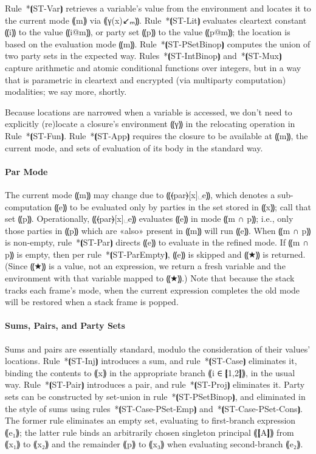 Rule~*⦗ST-Var⦘ retrieves a variable's value from the environment and
locates it to the current mode ⸨m⸩ via ⸨γ(x)↙ₘ⸩. Rule~*⦗ST-Lit⦘ evaluates
cleartext constant ⸨i⸩ to the value ⸨i@m⸩, or party set ⸨p⸩ to the value ⸨p@m⸩;
the location is based on the evaluation mode ⸨m⸩.  Rule~*⦗ST-PSetBinop⦘ computes
the union of two party sets in the expected way. Rules~*⦗ST-IntBinop⦘
and~*⦗ST-Mux⦘ capture arithmetic and atomic conditional functions over integers,
but in a way that is parametric in cleartext and encrypted (via multiparty
computation) modalities; we say more, shortly.

Because locations are narrowed when a variable is accessed, we don't need to
explicitly (re)locate a closure's environment ⸨γ⸩ in the relocating
operation in Rule~*⦗ST-Fun⦘. Rule~*⦗ST-App⦘ requires the closure to be available at ⸨m⸩,
the current mode, and sets of evaluation of its body in the standard way.

\paragraph*{Par Mode}

The current mode ⸨m⸩ may change due to ⸨⦑par⦒[x]␣e⸩, which denotes a
sub-computation ⸨e⸩ to be evaluated only by parties in the set stored
in ⸨x⸩; call that set ⸨p⸩. Operationally, ⸨⦑par⦒[x]␣e⸩ evaluates ⸨e⸩ in mode
⸨m ∩ p⸩; i.e., only those parties in ⸨p⸩ which are «also» present in ⸨m⸩ will run ⸨e⸩.
When ⸨m ∩ p⸩ is non-empty, rule~*⦗ST-Par⦘ directs ⸨e⸩ to evaluate in the refined mode.
If ⸨m ∩ p⸩ is empty, then per rule~*⦗ST-ParEmpty⦘, ⸨e⸩ is skipped and ⸨★⸩ is returned.
(Since ⸨★⸩ is a value, not an expression, we return a fresh variable and the
environment with that variable mapped to ⸨★⸩.) Note that because the stack
tracks each frame's mode, when the current expression completes the old
mode will be restored when a stack frame is popped.

\paragraph*{Sums, Pairs, and Party Sets}

Sums and pairs are essentially standard, modulo the consideration of their values' locations.
%
Rule~*⦗ST-Inj⦘ introduces a sum, and rule~*⦗ST-Case⦘ eliminates it, binding the
contents to ⸨x⸩ in the appropriate branch ⸨i ∈ ❴1,2❵⸩, in the usual way.
%
Rule~*⦗ST-Pair⦘ introduces a pair, and rule~*⦗ST-Proj⦘ eliminates it.
%
Party sets can be constructed by set-union in rule~*⦗ST-PSetBinop⦘,
and eliminated in the style of sums using rules~*⦗ST-Case-PSet-Emp⦘
and~*⦗ST-Case-PSet-Cons⦘. The former rule eliminates an empty set,
evaluating to first-branch expression ⸨e₁⸩; the latter rule binds an
arbitrarily chosen singleton principal ⸨❴A❵⸩ from ⸨x₁⸩ to ⸨x₂⸩ and the
remainder ⸨p⸩ to ⸨x₃⸩ when evaluating second-branch ⸨e₂⸩.

